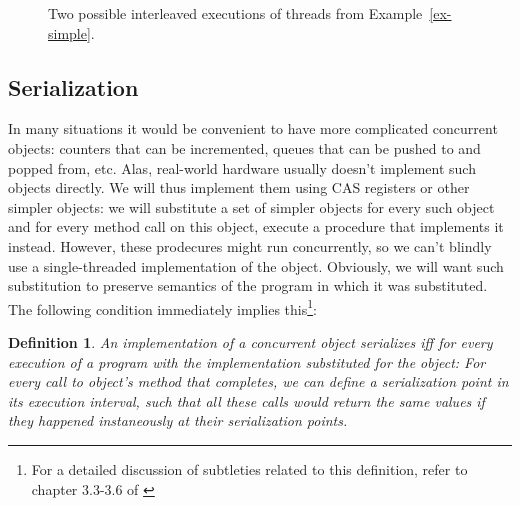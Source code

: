 \documentclass[a4paper,11pt]{article}
\newcommand{\atomic}[4]{\node(lab#1) at (#3,-#4+0.5) {#2};\draw (#3,-#4-0.1) to (lab#1);\node[inner sep=0pt](#1) at (#3,-#4) {};}
\newtheorem{definition}{Definition}
\newcommand{\fn}[1]{\textsc{#1}}
\begin{document}
\begin{figure}[!h]

\caption{Two possible interleaved executions of threads from Example~\ref{ex-simple}.}
\label{fig-ex-simple}
\end{figure}

\subsection{Serialization}
In many situations it would be convenient to have more complicated concurrent objects: counters that can be incremented,
queues that can be pushed to and popped from, etc. Alas, real-world hardware usually doesn't implement such objects
directly. We will thus implement them using CAS registers or other simpler objects: we will substitute a set of simpler objects for every such object and for every method call on this object, execute a procedure that implements it instead.
However, these prodecures might run concurrently, so we can't blindly use a single-threaded implementation of the object.
Obviously, we will want such substitution to preserve semantics of the program in which it was substituted. The following condition immediately implies
this\footnote{For a detailed discussion of subtleties related to this definition, refer to chapter 3.3-3.6 of \cite{TheArt}}:

\begin{definition}
An implementation of a concurrent object \emph{serializes} iff for every execution of a program with the implementation
substituted for the object:
For every call to object's method that completes, we can define a \emph{serialization point} in its execution
interval, such that all these calls would return the same values if they happened instaneously at their serialization
points.
\end{definition}
\end{document}
